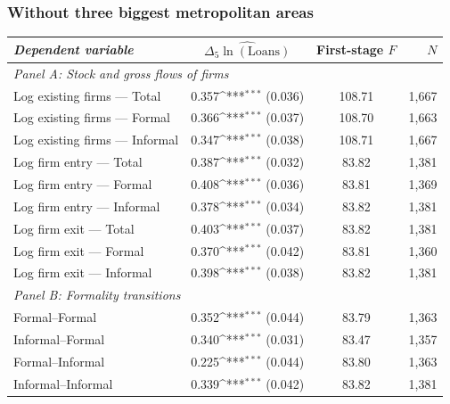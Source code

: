 \documentclass[aspectratio=169]{beamer}
\newcommand{\sym}[1]{\ifmmode^{#1}\else\(^{#1}\)\fi}
\begin{document}

\begin{frame}[noframenumbering]
\frametitle{\textbf{Without three biggest metropolitan areas}} \label{womet}

\begin{center}
    \scriptsize
    \begin{tabular}{lccr}
        \toprule
        \textit{Dependent variable} & $\widehat{\Delta_5\ln(\text{Loans})}$ & First-stage $F$ & $N$ \\
        \midrule
        \multicolumn{4}{l}{\textit{Panel A: Stock and gross flows of firms}} \\
        Log existing firms --- Total    & \phantom{$-$}0.357\sym{***} (0.036) & 108.71 & 1{,}667 \\
        Log existing firms --- Formal   & \phantom{$-$}0.366\sym{***} (0.037) & 108.70 & 1{,}663 \\
        Log existing firms --- Informal & \phantom{$-$}0.347\sym{***} (0.038) & 108.71 & 1{,}667 \\
        Log firm entry --- Total        & \phantom{$-$}0.387\sym{***} (0.032) & 83.82  & 1{,}381 \\
        Log firm entry --- Formal       & \phantom{$-$}0.408\sym{***} (0.036) & 83.81  & 1{,}369 \\
        Log firm entry --- Informal     & \phantom{$-$}0.378\sym{***} (0.034) & 83.82  & 1{,}381 \\
        Log firm exit --- Total         & \phantom{$-$}0.403\sym{***} (0.037) & 83.82  & 1{,}381 \\
        Log firm exit --- Formal        & \phantom{$-$}0.370\sym{***} (0.042) & 83.81  & 1{,}360 \\
        Log firm exit --- Informal      & \phantom{$-$}0.398\sym{***} (0.038) & 83.82  & 1{,}381 \\
        \midrule
        \multicolumn{4}{l}{\textit{Panel B: Formality transitions}} \\
        Formal--Formal                  & \phantom{$-$}0.352\sym{***} (0.044) & 83.79  & 1{,}363 \\
        Informal--Formal                & \phantom{$-$}0.340\sym{***} (0.031) & 83.47  & 1{,}357 \\
        Formal--Informal                & \phantom{$-$}0.225\sym{***} (0.044) & 83.80  & 1{,}363 \\
        Informal--Informal              & \phantom{$-$}0.339\sym{***} (0.042) & 83.82  & 1{,}381 \\
        \bottomrule
    \end{tabular}
\end{center}

\hyperlink{robustness}{}

\end{frame}
\end{document}

